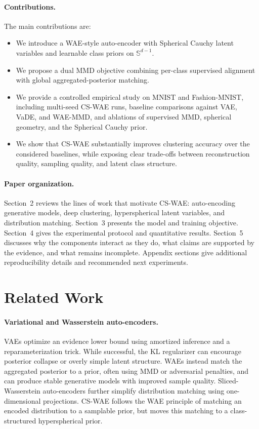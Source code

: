 \documentclass[10pt]{article}
\begin{document}
\paragraph{Contributions.}
The main contributions are:
\begin{itemize}
    \item We introduce a WAE-style auto-encoder with Spherical Cauchy latent variables and learnable class priors on $\mathbb{S}^{d-1}$.
    \item We propose a dual MMD objective combining per-class supervised alignment with global aggregated-posterior matching.
    \item We provide a controlled empirical study on MNIST and Fashion-MNIST, including multi-seed CS-WAE runs, baseline comparisons against VAE, VaDE, and WAE-MMD, and ablations of supervised MMD, spherical geometry, and the Spherical Cauchy prior.
    \item We show that CS-WAE substantially improves clustering accuracy over the considered baselines, while exposing clear trade-offs between reconstruction quality, sampling quality, and latent class structure.
\end{itemize}

\paragraph{Paper organization.}
Section~2 reviews the lines of work that motivate CS-WAE: auto-encoding generative models, deep clustering, hyperspherical latent variables, and distribution matching. Section~3 presents the model and training objective. Section~4 gives the experimental protocol and quantitative results. Section~5 discusses why the components interact as they do, what claims are supported by the evidence, and what remains incomplete. Appendix sections give additional reproducibility details and recommended next experiments.

\section{Related Work}

\paragraph{Variational and Wasserstein auto-encoders.}
VAEs \citep{kingma2013autoencoding} optimize an evidence lower bound using amortized inference and a reparameterization trick. While successful, the KL regularizer can encourage posterior collapse or overly simple latent structure. WAEs \citep{tolstikhin2017wasserstein} instead match the aggregated posterior to a prior, often using MMD or adversarial penalties, and can produce stable generative models with improved sample quality. Sliced-Wasserstein auto-encoders \citep{kolouri2018sliced} further simplify distribution matching using one-dimensional projections. CS-WAE follows the WAE principle of matching an encoded distribution to a samplable prior, but moves this matching to a class-structured hyperspherical prior.
\end{document}
